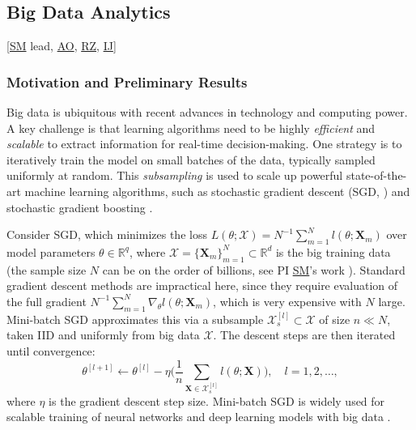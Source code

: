 \documentclass[11pt]{NSFamsart}
\newcommand{\SM}{\hyperlink{SMlink}{SM}\xspace}
\newcommand{\AO}{\hyperlink{AOlink}{AO}\xspace}
\newcommand{\IJi}{\hyperlink{IJlink}{IJ}\xspace}
\newcommand{\RZ}{\hyperlink{RZlink}{RZ}\xspace}
\newcommand{\bX}{{\boldsymbol{X}}}
\begin{document}
\subsection{Big Data Analytics} [\SM lead, \AO, \RZ, \IJi{}] \label{sec:bigdata}

\subsubsection{Motivation and Preliminary Results} 
Big data is ubiquitous with recent advances in technology and computing power. A key challenge is that learning algorithms need to be highly \textit{efficient} and \textit{scalable} to extract information for real-time decision-making. One strategy is to iteratively train the model on small batches of the data, typically sampled uniformly at random. This \textit{subsampling} is used to scale up powerful state-of-the-art machine learning algorithms, such as stochastic gradient descent (SGD, \cite{Bot2010}) and stochastic gradient boosting \cite{friedman2002stochastic}.

\sloppypar Consider SGD, which minimizes the loss $L(\theta;\mathcal{X}) = N^{-1} \sum_{m=1}^N l(\theta;\bX_m)$ over model parameters $\theta \in \mathbb{R}^q$, where $\mathcal{X} = \{\bX_m\}_{m=1}^N \subset \mathbb{R}^d$ is the big training data (the sample size $N$ can be on the order of billions, see PI \SM's work \cite{mak2018efficient}). Standard gradient descent methods \cite{nocedal2006numerical} are impractical here, since they require evaluation of the full gradient $N^{-1} \sum_{m=1}^N \nabla_\theta l(\theta;\bX_m)$, which is very expensive with $N$ large. Mini-batch SGD \cite{Bot2010} approximates this via a subsample $\mathcal{X}_{s}^{[l]} \subset \mathcal{X}$ of size $n \ll N$, taken IID and uniformly from big data $\mathcal{X}$. The descent steps are then iterated until convergence:
\begin{equation}\label{eq:sgdopt}
\theta^{[l+1]} \leftarrow \theta^{[l]} - \eta \Biggl( \frac{1}{n} \sum_{\bX \in \mathcal{X}_{s}^{[l]}} l(\theta;\bX)\Biggr) , \quad l = 1, 2, \ldots,
\end{equation}
where $\eta$ is the gradient descent step size. Mini-batch SGD is widely used for scalable training of neural networks and deep learning models with big data \citep{srivastava2014dropout}.
\end{document}
